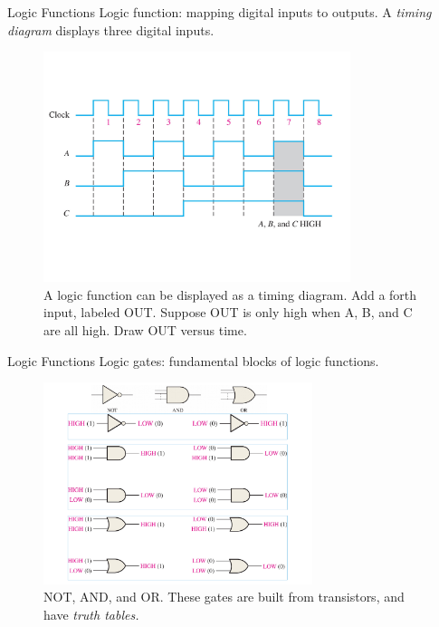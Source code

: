 \documentclass{beamer}
\begin{document}
\begin{frame}{Logic Functions}
Logic function: mapping digital inputs to outputs.  A \textit{timing diagram} displays three digital inputs.
\begin{figure}
\includegraphics[width=0.8\textwidth,trim=0cm 4cm 0cm 4cm,clip=true]{digital4.pdf}
\caption{\label{fig:digital4} A logic function can be displayed as a timing diagram.  Add a forth input, labeled OUT.  Suppose OUT is only high when A, B, and C are all high.  Draw OUT versus time.}
\end{figure}
\end{frame}

\begin{frame}{Logic Functions}
Logic gates: fundamental blocks of logic functions.
\begin{figure}
\includegraphics[width=0.7\textwidth]{gates1.pdf}
\caption{\label{fig:digital5} NOT, AND, and OR.  These gates are built from transistors, and have \textit{truth tables.}}
\end{figure}
\end{frame}
\end{document}
